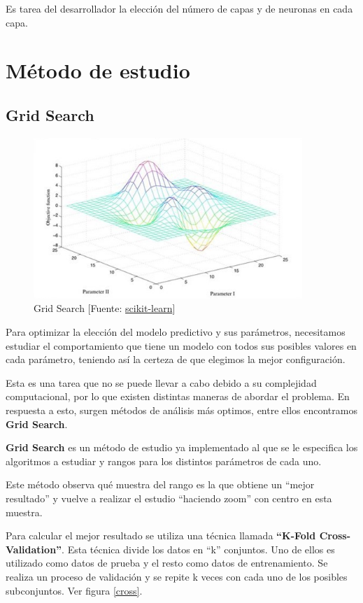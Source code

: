 	Es tarea del desarrollador la elección del número de capas y de neuronas en cada capa.

\section{Método de estudio}
\label{makereference4.3}
	\subsection{Grid Search}

	\begin{figure}[htb]
		\begin{center}
			\includegraphics[width=4in]{figures/grid_search.png}
			\caption{Grid Search [Fuente: \href{www.scikit-learn.org}{scikit-learn}]}
		\end{center}
		\label{grid}
	\end{figure}

	Para optimizar la elección del modelo predictivo y sus parámetros, necesitamos estudiar el comportamiento que tiene un modelo con todos sus posibles valores en cada parámetro, teniendo así la certeza de que elegimos la mejor configuración.

	Esta es una tarea que no se puede llevar a cabo debido a su complejidad computacional, por lo que existen distintas maneras de abordar el problema. En respuesta a esto, surgen métodos de análisis más optimos, entre ellos encontramos \textbf{Grid Search}.

	\textbf{Grid Search} es un método de estudio ya implementado al que se le especifica los algoritmos a estudiar y rangos para los distintos parámetros de cada uno. 

	Este método observa qué muestra del rango es la que obtiene un ``mejor resultado'' y vuelve a realizar el estudio ``haciendo zoom'' con centro en esta muestra.

	Para calcular el mejor resultado se utiliza una técnica llamada \textbf{``K-Fold Cross-Validation''}. Esta técnica divide los datos en ``k'' conjuntos. Uno de ellos es utilizado como datos de prueba y el resto como datos de entrenamiento. Se realiza un proceso de validación y se repite k veces con cada uno de los posibles subconjuntos. Ver figura \ref{cross}.

